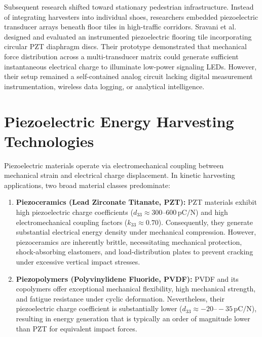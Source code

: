 Subsequent research shifted toward stationary pedestrian infrastructure. Instead of integrating harvesters into individual shoes, researchers embedded piezoelectric transducer arrays beneath floor tiles in high-traffic corridors. Sravani et al.~\cite{sravani2020piezoelectric} designed and evaluated an instrumented piezoelectric flooring tile incorporating circular PZT diaphragm discs. Their prototype demonstrated that mechanical force distribution across a multi-transducer matrix could generate sufficient instantaneous electrical charge to illuminate low-power signaling LEDs. However, their setup remained a self-contained analog circuit lacking digital measurement instrumentation, wireless data logging, or analytical intelligence.

\section{Piezoelectric Energy Harvesting Technologies}
Piezoelectric materials operate via electromechanical coupling between mechanical strain and electrical charge displacement. In kinetic harvesting applications, two broad material classes predominate:
\begin{enumerate}
    \item \textbf{Piezoceramics (Lead Zirconate Titanate, PZT):} PZT materials exhibit high piezoelectric charge coefficients ($d_{33} \approx 300\text{--}600\,\text{pC/N}$) and high electromechanical coupling factors ($k_{33} \approx 0.70$). Consequently, they generate substantial electrical energy density under mechanical compression. However, piezoceramics are inherently brittle, necessitating mechanical protection, shock-absorbing elastomers, and load-distribution plates to prevent cracking under excessive vertical impact stresses.
    \item \textbf{Piezopolymers (Polyvinylidene Fluoride, PVDF):} PVDF and its copolymers offer exceptional mechanical flexibility, high mechanical strength, and fatigue resistance under cyclic deformation. Nevertheless, their piezoelectric charge coefficient is substantially lower ($d_{33} \approx -20\text{--}-35\,\text{pC/N}$), resulting in energy generation that is typically an order of magnitude lower than PZT for equivalent impact forces.
\end{enumerate}

